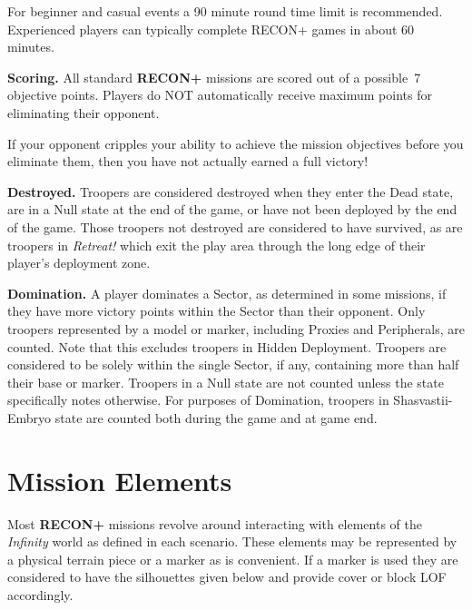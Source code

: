 \documentclass[14pt,dvipsnames]{extarticle}
\newcommand{\missionrule}[1]{\noindent\textbf{#1}\xspace}
\newcommand{\reconplus}{\textbf{RECON+}\xspace}
\begin{document}
\begin{recon}
  For beginner and casual events a 90 minute round time limit is
  recommended. Experienced players can typically complete RECON+ games
  in about 60 minutes.
\end{recon}

\missionrule{Scoring.}  All standard \reconplus missions are scored out of a
possible~7 objective points.  Players do NOT automatically receive
maximum points for eliminating their opponent.

\begin{recon}
  If your opponent cripples your ability to achieve the mission
  objectives before you eliminate them, then you have not actually
  earned a full victory!
\end{recon}

\missionrule{Destroyed.} Troopers are considered destroyed when they
enter the Dead state, are in a Null state at the end of the game, or
have not been deployed by the end of the game.  Those troopers not
destroyed are considered to have survived, as are troopers in
\emph{Retreat!} which exit the play area through the long edge of
their player's deployment zone.

\pagebreak
\missionrule{Domination.}  A player dominates a Sector, as determined
in some missions, if they have more victory points within the Sector
than their opponent.  Only troopers represented by a model or marker,
including Proxies and Peripherals, are counted.  Note that this
excludes troopers in Hidden Deployment.  Troopers are considered to be
solely within the single Sector, if any, containing more than half
their base or marker.  Troopers in a Null state are not counted unless
the state specifically notes otherwise.  For purposes of Domination,
troopers in Shasvastii-Embryo state are counted both during the game
and at game end.

\section{Mission Elements}

Most \reconplus missions revolve around interacting with elements of
the \emph{Infinity} world as defined in each scenario.  These elements
may be represented by a physical terrain piece or a marker as is
convenient.  If a marker is used they are considered to have the
silhouettes given below and provide cover or block LOF accordingly.

\end{document}
